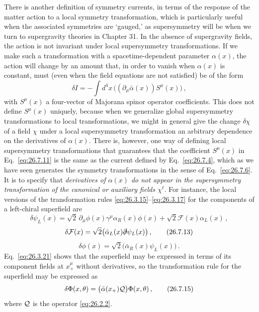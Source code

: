 There is another definition of symmetry currents, in terms of the response
of the matter action to a local symmetry transformation, which is
particularly useful when the associated symmetries are `gauged,' as
supersymmetry will be when we turn to supergravity theories in Chapter 31.
In the absence of supergravity fields, the action is not invariant under
local supersymmetry transformations. If we make such a transformation with a
spacetime-dependent parameter \(\alpha(x)\), the action will change by an
amount that, in order to vanish when \(\alpha(x)\) is constant, must (even
when the field equations are not satisfied) be of the form
\begin{equation}
  \delta I
  =-\int d^4x\,\bigl((\partial_\mu\bar\alpha(x))S^\mu(x)\bigr)\,,
  \tag{26.7.11}\label{eq:26.7.11}
\end{equation}
with \(S^\mu(x)\) a four-vector of Majorana spinor operator coefficients.
This does not define \(S^\mu(x)\) uniquely, because when we generalize global
supersymmetry transformations to local transformations, we might in general
give the change \(\delta\chi\) of a field \(\chi\) under a local
supersymmetry transformation an arbitrary dependence on the derivatives of
\(\alpha(x)\). There is, however, one way of defining local supersymmetry
transformations that guarantees that the coefficient \(S^\mu(x)\) in
Eq.~\eqref{eq:26.7.11} is the same as the current defined by
Eq.~\eqref{eq:26.7.4}, which as we have seen generates the symmetry
transformations in the sense of Eq.~\eqref{eq:26.7.6}. It is to specify that
\emph{derivatives of \(\alpha(x)\) do not appear in the supersymmetry
transformation of the canonical or auxiliary fields \(\chi^\ell\)}. For
instance, the local versions of the transformation rules
\eqref{eq:26.3.15}--\eqref{eq:26.3.17} for the components of a left-chiral
superfield are
\begin{equation}
  \delta\psi_L(x)
  =\sqrt{2}\,\partial_\mu\phi(x)\gamma^\mu\alpha_R(x)\phi(x)
   +\sqrt{2}\mathcal{F}(x)\alpha_L(x)\,,
  \tag{26.7.12}\label{eq:26.7.12}
\end{equation}
\begin{equation}
  \delta\mathcal{F}(x)
  =\sqrt{2}\bigl(\bar\alpha_L(x)\sl{\partial}\psi_L(x)\bigr)\,,
  \tag{26.7.13}\label{eq:26.7.13}
\end{equation}
\begin{equation}
  \delta\phi(x)
  =\sqrt{2}\bigl(\bar\alpha_R(x)\psi_L(x)\bigr)\,.
  \tag{26.7.14}\label{eq:26.7.14}
\end{equation}
Eq.~\eqref{eq:26.3.21} shows that the superfield may be expressed in terms of
its component fields at \(x_+^\mu\) without derivatives, so the
transformation rule for the superfield may be expressed as
\begin{equation}
  \delta\Phi(x,\theta)
  =\bigl(\bar\alpha(x_+)\SuperQ\bigr)\Phi(x,\theta)\,,
  \tag{26.7.15}\label{eq:26.7.15}
\end{equation}
where \(\SuperQ\) is the operator \eqref{eq:26.2.2}.

